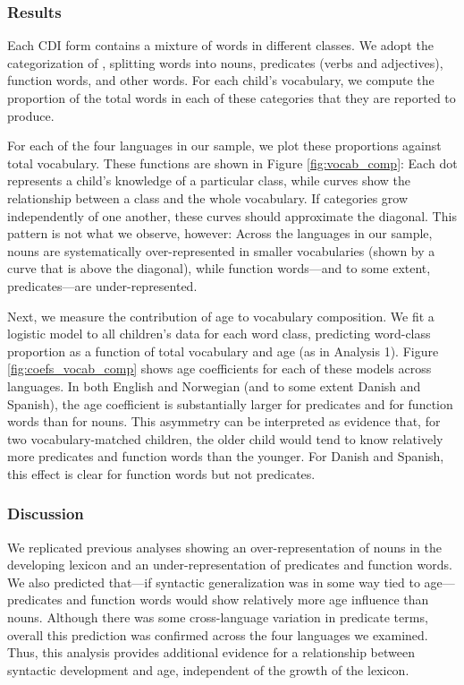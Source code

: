 \documentclass[10pt,letterpaper]{article}
\begin{document}
\subsubsection{Results}

Each CDI form contains a mixture of words in different classes. We adopt the categorization of , splitting words into nouns, predicates (verbs and adjectives), function words, and other words. For each child's vocabulary, we compute the proportion of the total words in each of these categories that they are reported to produce.

For each of the four languages in our sample, we plot these proportions against total vocabulary. These functions are shown in Figure \ref{fig:vocab_comp}: Each dot represents a child's knowledge of a particular class, while curves show the relationship between a class and the whole vocabulary. If categories grow independently of one another, these curves should approximate the diagonal. This pattern is not what we observe, however: Across the languages in our sample, nouns are systematically over-represented in smaller vocabularies (shown by a curve that is above the diagonal), while function words---and to some extent, predicates---are under-represented. 

Next, we measure the contribution of age to vocabulary composition. We fit a logistic model to all children's data for each word class, predicting word-class proportion as a function of total vocabulary and age (as in Analysis 1). Figure \ref{fig:coefs_vocab_comp} shows age coefficients for each of these models across languages. In both English and Norwegian (and to some extent Danish and Spanish), the age coefficient is substantially larger for predicates and for function words than for nouns. This asymmetry can be interpreted as evidence that, for two vocabulary-matched children, the older child would tend to know relatively more predicates and function words than the younger. For Danish and Spanish, this effect is clear for function words but not predicates.

\subsubsection{Discussion}

We replicated previous analyses \cite{bates1994} showing an over-representation of nouns in the developing lexicon and an under-representation of predicates and function words. We also predicted that---if syntactic generalization was in some way tied to age---predicates and function words would show relatively more age influence than nouns. Although there was some cross-language variation in predicate terms, overall this prediction was confirmed across the four languages we examined. Thus, this analysis provides additional evidence for a relationship between syntactic development and age, independent of the growth of the lexicon.
\end{document}
